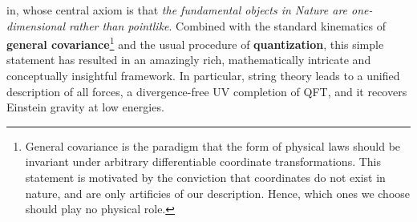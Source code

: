 \begin{enumerate}
	in, whose central axiom is that \emph{the fundamental objects in Nature are one-dimensional rather than
	pointlike}. Combined with the standard kinematics of \textbf{general covariance}\footnote{General covariance is the paradigm that the form of physical laws should be invariant under arbitrary differentiable coordinate transformations. This statement is motivated by the conviction that coordinates do not exist in nature, and are only artificies of our description. Hence, which ones we choose should play no physical role.} and the usual procedure
	of \textbf{quantization}, this simple statement has resulted in an amazingly rich, mathematically intricate
	and conceptually insightful framework. In particular, string theory leads to a unified description of
	all forces, a divergence-free UV completion of QFT, and it recovers Einstein gravity at low energies.
\end{enumerate}

